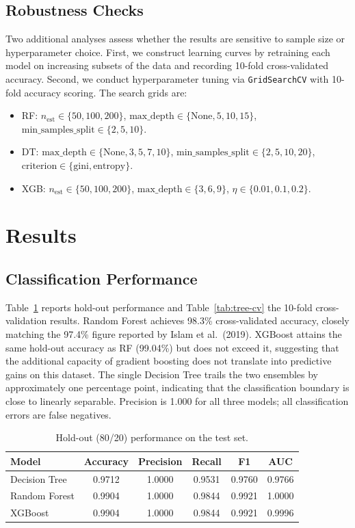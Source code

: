 \documentclass[11pt]{article}
\begin{document}
\subsection*{Robustness Checks}

Two additional analyses assess whether the results are sensitive to sample
size or hyperparameter choice. First, we construct learning curves by
retraining each model on increasing subsets of the data and recording 10-fold
cross-validated accuracy. Second, we conduct hyperparameter tuning via
\texttt{GridSearchCV} with 10-fold accuracy scoring. The search grids are:

\begin{itemize}
    \item RF: $n_\text{est}\!\in\!\{50,100,200\}$,
    $\text{max\_depth}\!\in\!\{\text{None},5,10,15\}$,
    $\text{min\_samples\_split}\!\in\!\{2,5,10\}$.
    \item DT: $\text{max\_depth}\!\in\!\{\text{None},3,5,7,10\}$,
    $\text{min\_samples\_split}\!\in\!\{2,5,10,20\}$,
    $\text{criterion}\!\in\!\{\text{gini},\text{entropy}\}$.
    \item XGB: $n_\text{est}\!\in\!\{50,100,200\}$,
    $\text{max\_depth}\!\in\!\{3,6,9\}$,
    $\eta\!\in\!\{0.01,0.1,0.2\}$.
\end{itemize}


\section*{Results}

\subsection*{Classification Performance}

Table~\ref{tab:tree-holdout} reports hold-out performance and
Table~\ref{tab:tree-cv} the 10-fold cross-validation results. Random Forest
achieves 98.3\% cross-validated accuracy, closely matching the 97.4\% figure
reported by Islam et al.\ (2019). XGBoost attains the same hold-out accuracy
as RF (99.04\%) but does not exceed it, suggesting that the additional
capacity of gradient boosting does not translate into predictive gains on
this dataset. The single Decision Tree trails the two ensembles by
approximately one percentage point, indicating that the classification
boundary is close to linearly separable. Precision is 1.000 for all three
models; all classification errors are false negatives.

\begin{table}[H]
\centering
\small
\caption{Hold-out (80/20) performance on the test set.}
\label{tab:tree-holdout}
\begin{tabular}{lccccc}
\toprule
Model & Accuracy & Precision & Recall & F1 & AUC \\
\midrule
Decision Tree & 0.9712 & 1.0000 & 0.9531 & 0.9760 & 0.9766 \\
Random Forest & 0.9904 & 1.0000 & 0.9844 & 0.9921 & 1.0000 \\
XGBoost       & 0.9904 & 1.0000 & 0.9844 & 0.9921 & 0.9996 \\
\bottomrule
\end{tabular}
\end{table}
\end{document}
